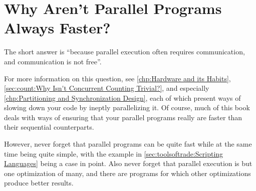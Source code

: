 
\section{Why Aren't Parallel Programs Always Faster?}
\label{sec:app:questions:Why Aren't Parallel Programs Always Faster?}

The short answer is ``because parallel execution often requires
communication, and communication is not free''.

For more information on this question, see
\cref{chp:Hardware and its Habits},
\cref{sec:count:Why Isn't Concurrent Counting Trivial?},
and especially
\cref{chp:Partitioning and Synchronization Design},
each of which present ways of slowing down your code by ineptly
parallelizing it.
Of course, much of this book deals with ways of ensuring that your
parallel programs really are faster than their sequential counterparts.

However, never forget that parallel programs can be quite fast while at
the same time being quite simple, with the example in
\cref{sec:toolsoftrade:Scripting Languages}
being a case in point.
Also never forget that parallel execution is but one optimization of many,
and there are programs for which other optimizations produce better results.
